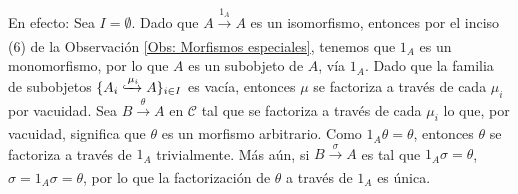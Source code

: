 \documentclass[tesis]{subfiles}
\begin{document}
\begin{Obs}
\begin{enumerate}[label=(\arabic*)]
            En efecto: Sea $I=\emptyset$. Dado que $A\xrightarrow[]{1_A} A$ es un isomorfismo, entonces por el inciso (6) de la Observación \ref{Obs: Morfismos especiales}, tenemos que $1_A$ es un monomorfismo, por lo que $A$ es un subobjeto de $A$, vía $1_A$. Dado que la familia de subobjetos $\{A_i\xhookrightarrow{\mu_i} A\}_{i\in I}$ es vacía, entonces $\mu$ se factoriza a través de cada $\mu_i$ por vacuidad. Sea $B\xrightarrow[]{\theta} A$ en $\mathscr{C}$ tal que se factoriza a través de cada $\mu_i$ lo que, por vacuidad, significa que $\theta$ es un morfismo arbitrario. Como $1_A\theta=\theta$, entonces $\theta$ se factoriza a través de $1_A$ trivialmente. Más aún, si $B\xrightarrow[]{\sigma} A$ es tal que $1_A\sigma=\theta$, $\sigma=1_A\sigma=\theta$, por lo que la factorización de $\theta$ a través de $1_A$ es única. 
    \end{enumerate}
\end{Obs}
\end{document}
